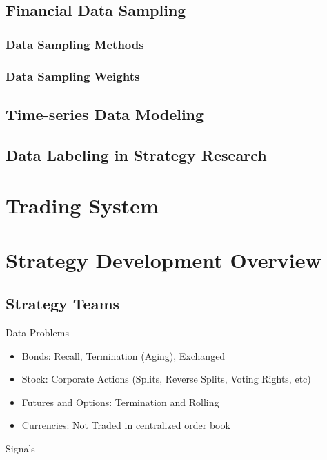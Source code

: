 \documentclass[11pt, openany]{book}              %
\begin{document}
\section{Financial Data Sampling}

\subsection{Data Sampling Methods}

\subsection{Data Sampling Weights}

\section{Time-series Data Modeling}

\section{Data Labeling in Strategy Research}




\chapter{ Trading System }

\chapter{ Strategy Development Overview}

\section{Strategy Teams}





Data Problems
\begin{itemize}
 \item Bonds: Recall, Termination (Aging), Exchanged
 \item Stock: Corporate Actions (Splits, Reverse Splits, Voting Rights, etc)
 \item Futures and Options: Termination and Rolling
 \item Currencies: Not Traded in centralized order book 
\end{itemize}

Signals
\end{document}
